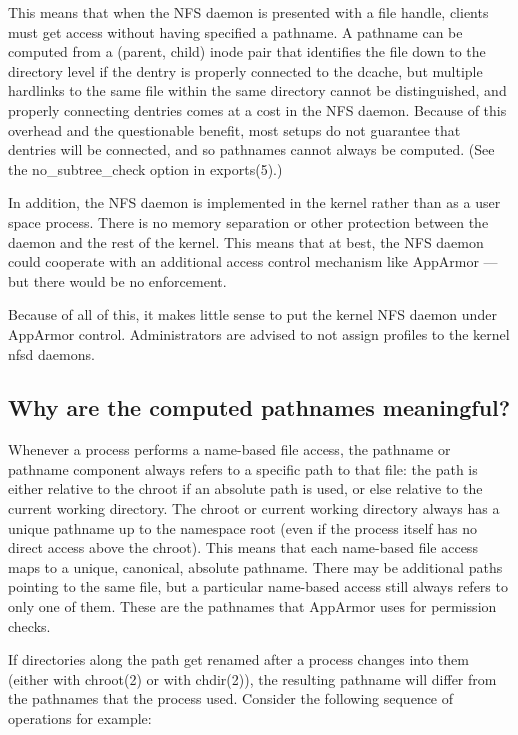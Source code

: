 \documentclass[a4paper]{article}
\begin{document}
This means that when the NFS daemon is presented with a file handle,
clients must get access without having specified a pathname.  A pathname
can be computed from a (parent, child) inode pair that identifies the
file down to the directory level if the dentry is properly connected to
the dcache, but multiple hardlinks to the same file within the same
directory cannot be distinguished, and properly connecting dentries
comes at a cost in the NFS daemon.  Because of this overhead and the
questionable benefit, most setups do not guarantee that dentries will be
connected, and so pathnames cannot always be computed.  (See the
no\_subtree\_check option in exports(5).)

In addition, the NFS daemon is implemented in the kernel rather than as
a user space process.  There is no memory separation or other protection
between the daemon and the rest of the kernel.  This means that at best,
the NFS daemon could cooperate with an additional access control
mechanism like AppArmor --- but there would be no enforcement.

Because of all of this, it makes little sense to put the kernel NFS
daemon under AppArmor control.  Administrators are advised to not assign
profiles to the kernel nfsd daemons.


\subsection{Why are the computed pathnames meaningful?}

Whenever a process performs a name-based file access, the pathname or
pathname component always refers to a specific path to that file: the
path is either relative to the chroot if an absolute path is used, or
else relative to the current working directory.  The chroot or current
working directory always has a unique pathname up to the namespace root
(even if the process itself has no direct access above the chroot).
This means that each name-based file access maps to a unique, canonical,
absolute pathname.  There may be additional paths pointing to the same
file, but a particular name-based access still always refers to only one
of them.  These are the pathnames that AppArmor uses for permission
checks.

If directories along the path get renamed after a process changes into
them (either with chroot(2) or with chdir(2)), the resulting pathname
will differ from the pathnames that the process used.  Consider the
following sequence of operations for example:
\end{document}
